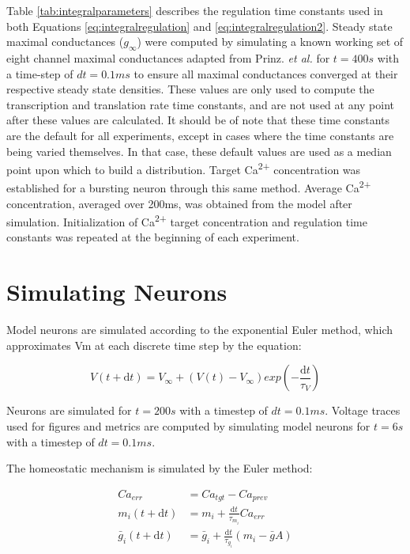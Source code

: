 Table \ref{tab:integralparameters} describes the regulation time constants used in both Equations \ref{eq:integralregulation} and \ref{eq:integralregulation2}. Steady state maximal conductances ($g_\infty$) were computed by simulating a known working set of eight channel maximal conductances adapted from Prinz. \textit{et al.} for $t = 400s$ with a time-step of $dt = 0.1ms$ to ensure all maximal conductances converged at their respective steady state densities\cite{prinz_alternative_2003}. These values are only used to compute the transcription and translation rate time constants, and are not used at any point after these values are calculated. It should be of note that these time constants are the default for all experiments, except in cases where the time constants are being varied themselves. In that case, these default values are used as a median point upon which to build a distribution. Target Ca\textsuperscript{2+} concentration was established for a bursting neuron through this same method. Average Ca\textsuperscript{2+} concentration, averaged over 200ms, was obtained from the model after simulation. Initialization of Ca\textsuperscript{2+} target concentration and regulation time constants was repeated at the beginning of each experiment. 

\section{Simulating Neurons}

Model neurons are simulated according to the exponential Euler method,\cite{gorur-shandilya_xolotl_2018,dayan2001theoretical} which approximates \ac{Vm} at each discrete time step by the equation:

\begin{equation} \label{eq:expeuler}
V(t + \mathrm{d}t) = V_\infty + (V(t) - V_\infty)exp(-\frac{\mathrm{d}t}{\tau_V})
\end{equation}

Neurons are simulated for $t = 200s$ with a timestep of $dt = 0.1ms$. Voltage traces used for figures and metrics are computed by simulating model neurons for $t = 6s$ with a timestep of $dt = 0.1ms$.

The homeostatic mechanism is simulated by the Euler method\cite{gorur-shandilya_xolotl_2018}:

\begin{align} \label{eq:integraleuler}
    Ca_{err} &= Ca_{tgt} - Ca_{prev} \\
    m_i(t+\mathrm{d}t) &= m_i + \frac{\mathrm{d}t}{\tau_{m_i}}Ca_{err} \\
    \bar{g}_i(t+\mathrm{d}t) &= \bar{g}_i + \frac{\mathrm{d}t}{\tau_{g_i}}(m_i - \bar{g}A)
\end{align}

